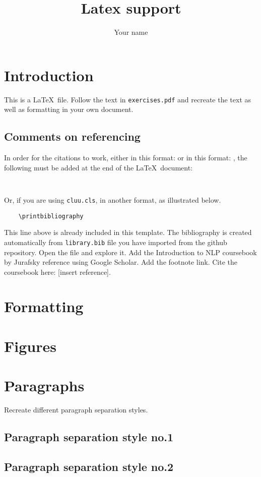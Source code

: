 \documentclass[wide]{cluu}
\title{Latex support}
\author{Your name}
\date{}
\begin{document}
\maketitle


\section{Introduction}
This is a \LaTeX\ file. Follow the text in \texttt{exercises.pdf}  and recreate the text as well as formatting in your own document.

\subsection{Comments on referencing}
In order for the citations to work, either in this format: \citep{devlin2018bert} or in this format: \cite{devlin2018bert}, the following must be added at the end of the \LaTeX\ document:
\begin{verbatim}
    
\end{verbatim}
Or, if you are using \texttt{cluu.cls}, in another format, as illustrated below.
\begin{verbatim}
    \printbibliography
\end{verbatim}
This line above is already included in this template. The bibliography is created automatically from \texttt{library.bib} file you have imported from the github repository. Open the file and explore it. Add the Introduction to NLP coursebook by Jurafsky reference using Google Scholar. Add the footnote link. Cite the coursebook here: [insert reference]. 

\section{Formatting}


\section{Figures}


\section{Paragraphs}
Recreate different paragraph separation styles.

\subsection{Paragraph separation style no.1}


\subsection{Paragraph separation style no.2}


\printbibliography
\end{document}
